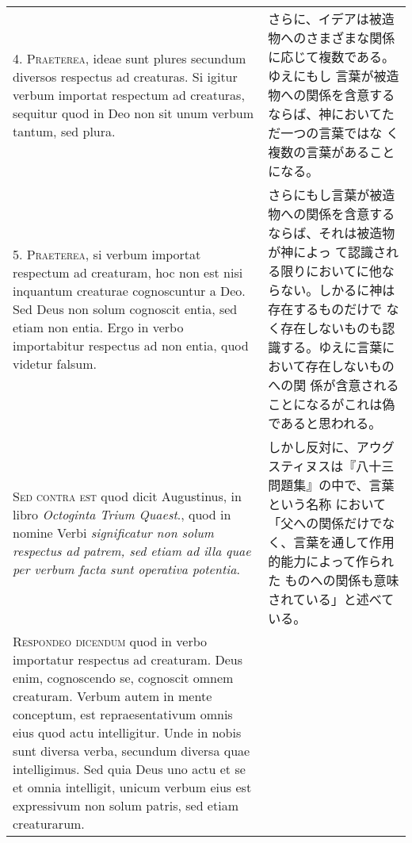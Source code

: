 \documentclass[10pt]{jsarticle} %
\begin{document}
\begin{longtable}{p{21em}p{21em}}
\\



4. {\scshape Praeterea}, ideae sunt plures secundum diversos respectus ad
creaturas. Si igitur verbum importat respectum ad creaturas, sequitur
quod in Deo non sit unum verbum tantum, sed plura.

&

さらに、イデアは被造物へのさまざまな関係に応じて複数である。ゆえにもし
 言葉が被造物への関係を含意するならば、神においてただ一つの言葉ではな
 く複数の言葉があることになる。

\\



5. {\scshape Praeterea}, si verbum importat respectum ad creaturam, hoc non est nisi
inquantum creaturae cognoscuntur a Deo. Sed Deus non solum cognoscit
entia, sed etiam non entia. Ergo in verbo importabitur respectus ad
non entia, quod videtur falsum.

&

さらにもし言葉が被造物への関係を含意するならば、それは被造物が神によっ
 て認識される限りにおいてに他ならない。しかるに神は存在するものだけで
 なく存在しないものも認識する。ゆえに言葉において存在しないものへの関
 係が含意されることになるがこれは偽であると思われる。

\\



{\scshape Sed contra est} quod dicit Augustinus, in libro {\itshape Octoginta Trium
Quaest}., quod in nomine Verbi {\itshape significatur non solum respectus ad
patrem, sed etiam ad illa quae per verbum facta sunt operativa
potentia}.

&

しかし反対に、アウグスティヌスは『八十三問題集』の中で、言葉という名称
 において「父への関係だけでなく、言葉を通して作用的能力によって作られた
 ものへの関係も意味されている」と述べている。

\\



{\scshape Respondeo dicendum} quod in verbo importatur respectus ad
creaturam. Deus enim, cognoscendo se, cognoscit omnem
creaturam. Verbum autem in mente conceptum, est repraesentativum omnis
eius quod actu intelligitur. Unde in nobis sunt diversa verba,
secundum diversa quae intelligimus. Sed quia Deus uno actu et se et
omnia intelligit, unicum verbum eius est expressivum non solum patris,
sed etiam creaturarum. 



\end{longtable}
\end{document}
